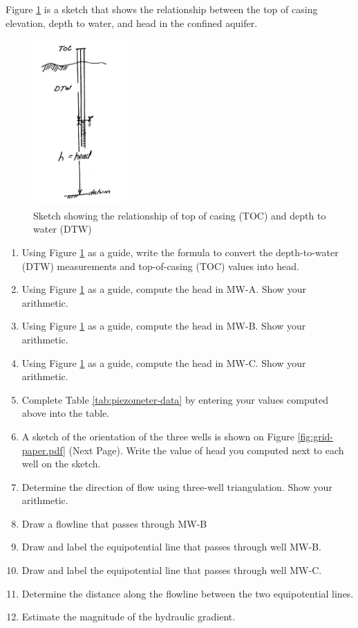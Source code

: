 \documentclass[12pt]{article}
\begin{document}
\begin{enumerate}
Figure \ref{fig:side-view-well.pdf} is a sketch that shows the relationship between the top of casing elevation, depth to water, and head in the confined aquifer.

\begin{figure}[h!] %
   \centering
   \includegraphics[height=2.5in]{side-view-well.pdf} 
   \caption{Sketch showing the relationship of top of casing (TOC) and depth to water (DTW)}
   \label{fig:side-view-well.pdf}
\end{figure}

\begin{enumerate}
\item Using Figure \ref{fig:side-view-well.pdf} as a guide, write the formula to convert the depth-to-water (DTW) measurements and top-of-casing (TOC) values into head.
\item Using Figure \ref{fig:side-view-well.pdf} as a guide, compute the head in MW-A.   Show your arithmetic.
\item Using Figure \ref{fig:side-view-well.pdf} as a guide, compute the head in MW-B.   Show your arithmetic.
\item Using Figure \ref{fig:side-view-well.pdf} as a guide, compute the head in MW-C.   Show your arithmetic.
\item Complete Table \ref{tab:piezometer-data} by entering your values computed above into the table.

\item A sketch of the orientation of the three wells is shown on Figure \ref{fig:grid-paper.pdf} (Next Page).   Write the value of head you computed next to each well on the sketch.
\item Determine the direction of flow using three-well triangulation.  Show your arithmetic.
\item Draw a flowline that passes through MW-B
\item Draw and label the equipotential line that passes through well MW-B.
\item Draw and label the equipotential line that passes through well MW-C.
\item Determine the distance along the flowline between the two equipotential lines.
\item Estimate the magnitude of the hydraulic gradient.


\end{enumerate}
\end{enumerate}
\end{document}
